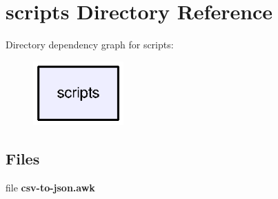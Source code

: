 \section{scripts Directory Reference}
\label{dir_53e6fa9553ac22a5646d2a2b2d7b97a1}
Directory dependency graph for scripts\+:\nopagebreak
\begin{figure}[H]
\begin{center}
\leavevmode
\includegraphics[width=98pt]{dir_53e6fa9553ac22a5646d2a2b2d7b97a1_dep}
\end{center}
\end{figure}
\subsection*{Files}
\begin{DoxyCompactItemize}
\item 
file {\bf csv-\/to-\/json.\+awk}
\end{DoxyCompactItemize}
